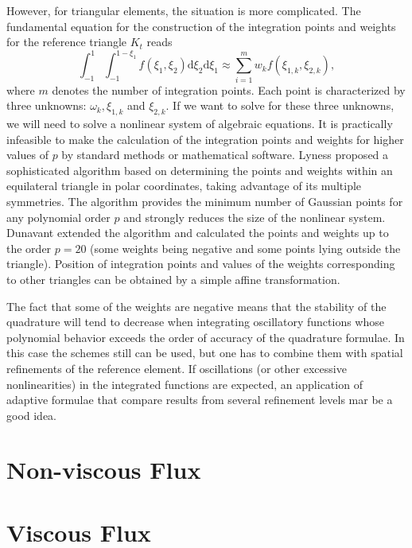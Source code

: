 \documentclass{develop-note}
\begin{document}
However, for triangular elements, the situation is more complicated. The fundamental equation for the construction of the integration points and weights for the reference triangle $K_{t}$ reads
\begin{equation}
  \int_{-1}^{1}\int_{-1}^{1-\xi_{1}}f(\xi_{1},\xi_{2})\mathrm{d}\xi_{2}\mathrm{d}\xi_{1}\approx\sum_{i=1}^{m}w_{k}f(\xi_{1,k},\xi_{2,k}),
\end{equation}
where $m$ denotes the number of integration points. Each point is characterized by three unknowns: $\omega_{k},\xi_{1,k}$ and $\xi_{2,k}$. If we want to solve for these three unknowns, we will need to solve a nonlinear system of algebraic equations. It is practically infeasible to make the calculation of the integration points and weights for higher values of $p$ by standard methods or mathematical software. Lyness\cite{lynessModerateDegreeSymmetric1975} proposed a sophisticated algorithm based on determining the points and weights within an equilateral triangle in polar coordinates, taking advantage of its multiple symmetries. The algorithm provides the minimum number of Gaussian points for any polynomial order $p$ and strongly reduces the size of the nonlinear system. Dunavant\cite{dunavantHighDegreeEfficient1985} extended the algorithm and calculated the points and weights up to the order $p=20$ (some weights being negative and some points lying outside the triangle). Position of integration points and values of the weights corresponding to other triangles can be obtained by a simple affine transformation.

The fact that some of the weights are negative means that the stability of the quadrature will tend to decrease when integrating oscillatory functions whose polynomial behavior exceeds the order of accuracy of the quadrature formulae. In this case the schemes still can be used, but one has to combine them with spatial refinements of the reference element. If oscillations (or other excessive nonlinearities) in the integrated functions are expected, an application of adaptive formulae that compare results from several refinement levels mar be a good idea.

\section{Non-viscous Flux}


\section{Viscous Flux}
\end{document}
